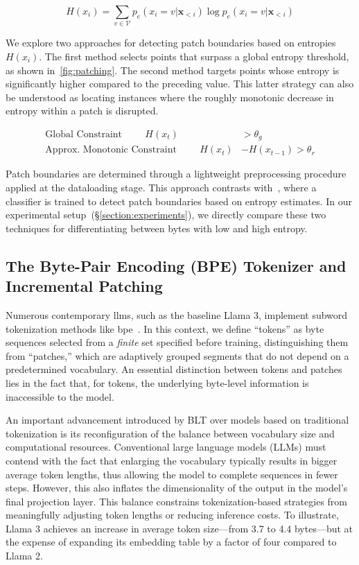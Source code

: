 \begin{equation}
H(x_i) = \sum_{v \in \mathcal{V}} p_{e}(x_i=v|\pmb{x}_{<i}) \log p_{e}(x_i=v|\pmb{x}_{<i})
\end{equation}

We explore two approaches for detecting patch boundaries based on entropies $H(x_i)$. The first method selects points that surpass a global entropy threshold, as shown in~\autoref{fig:patching}. The second method targets points whose entropy is significantly higher compared to the preceding value. This latter strategy can also be understood as locating instances where the roughly monotonic decrease in entropy within a patch is disrupted.

\begin{align*}
    \text{Global Constraint}\hspace{1cm}H(x_t)& > \theta_g\\
    \text{Approx. Monotonic Constraint}\hspace{1cm}H(x_t)& - H(x_{t-1}) > \theta_r
\end{align*}

Patch boundaries are determined through a lightweight preprocessing procedure applied at the dataloading stage. This approach contrasts with~\citet{nawrot-etal-2023-efficient}, where a classifier is trained to detect patch boundaries based on entropy estimates. In our experimental setup~(\S\ref{section:experiments}), we directly compare these two techniques for differentiating between bytes with low and high entropy.

\subsection{The Byte-Pair Encoding (BPE) Tokenizer and Incremental Patching}
\label{section:incremental-patching}
\label{section:bpe-patch}

Numerous contemporary llms, such as the baseline Llama 3, implement subword tokenization methods like bpe~\citep{gage1994new, sennrich-etal-2016-neural}. In this context, we define ``tokens'' as byte sequences selected from a \textit{finite} set specified before training, distinguishing them from ``patches,'' which are adaptively grouped segments that do not depend on a predetermined vocabulary. An essential distinction between tokens and patches lies in the fact that, for tokens, the underlying byte-level information is inaccessible to the model.

An important advancement introduced by {\textsc BLT} over models based on traditional tokenization is its reconfiguration of the balance between vocabulary size and computational resources. Conventional large language models (LLMs) must contend with the fact that enlarging the vocabulary typically results in bigger average token lengths, thus allowing the model to complete sequences in fewer steps. However, this also inflates the dimensionality of the output in the model’s final projection layer. This balance constrains tokenization-based strategies from meaningfully adjusting token lengths or reducing inference costs. To illustrate, Llama 3 achieves an increase in average token size—from 3.7 to 4.4 bytes—but at the expense of expanding its embedding table by a factor of four compared to Llama 2.

